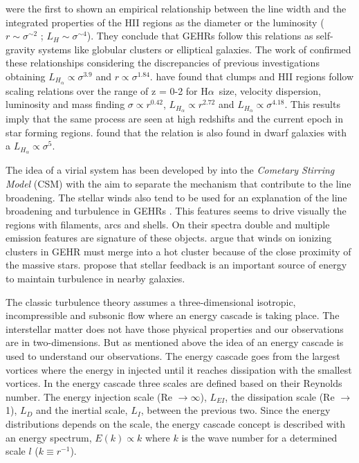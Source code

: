\documentclass[fleqn,usenatbib, useAMS, a4paper]{mnras}
\newcommand\halpha{H${\alpha}$}
\begin{document}
\citet{melnick1977,terlevich1981} were the first to shown an empirical relationship between the line width and the integrated properties of the HII regions as the diameter or the luminosity ($r \sim \sigma ^{\sim 2}$ ; $L_{H} \sim \sigma ^{\sim 4}$).
They conclude that GEHRs follow this relations as self-gravity systems like globular clusters or elliptical galaxies.
The work of \citet{1988A&A...201..199A} confirmed these relationships considering the discrepancies of previous investigations obtaining \(L_{H_{\alpha}} \propto \sigma^{3.9}\) and \(r \propto \sigma^{1.84}\).
\citet{2012MNRAS.422.3339W} have found that clumps and HII regions follow scaling relations over the range of z = 0-2 for \halpha\ size, velocity dispersion, luminosity and mass finding \(\sigma \propto r^{0.42}\), \(L_{H_{\alpha}} \propto r^{2.72}\) and \(L_{H_{\alpha}} \propto \sigma^{4.18}\). This results imply that the same process are seen at high redshifts and the current epoch in star forming regions. \citet{2015MNRAS.449.3568M} found that the relation is also found in dwarf galaxies with a \(L_{H_{\alpha}} \propto \sigma^{5}\).   

The idea of a virial system has been developed by \citet{1993ApJ...418..767T,munoz1996} into the \textit{Cometary Stirring Model} (CSM) with the aim to separate the mechanism that contribute to the line broadening.
The stellar winds also tend to be used for an explanation of the line broadening and turbulence in GEHRs \citep{1994ApJ...425..720C}.
This features seems to drive visually the regions with filaments, arcs and shells.
On their spectra double and multiple emission features are signature of these objects.
\citet{2020MNRAS.494...97S} argue that winds on ionizing clusters in GEHR must merge into a hot cluster because of the close proximity of the massive stars.
\citet{2019ApJ...871...17U} propose that stellar feedback is an important source of energy to maintain turbulence in nearby galaxies.

The classic turbulence theory \citep{kolm1} assumes a three-dimensional isotropic, incompressible and subsonic flow where an energy cascade is taking place.
The interstellar matter does not have those physical properties and our observations are in two-dimensions.
But as mentioned above the idea of an energy cascade is used to understand our observations.
The energy cascade goes from the largest vortices where the energy in injected until it reaches dissipation with the smallest vortices.
In the energy cascade three scales are defined based on their Reynolds number.
The energy injection scale (Re $\rightarrow \infty$), $L_{EI}$, the dissipation scale (Re $\rightarrow$ 1), $L_{D}$ and the inertial scale, $L_{I}$, between the previous two.
Since the energy distributions depends on the scale, the energy cascade concept is described with an energy spectrum, $E(k) \propto k$ where $k$ is the wave number for a determined scale $l$ ($k \equiv r^{-1}$).
\end{document}
